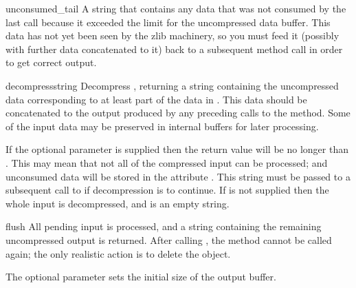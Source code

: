 \begin{memberdesc}{unconsumed_tail}
A string that contains any data that was not consumed by the last
 call because it exceeded the limit for the
uncompressed data buffer.  This data has not yet been seen by the zlib
machinery, so you must feed it (possibly with further data
concatenated to it) back to a subsequent  method
call in order to get correct output.
\end{memberdesc}


\begin{methoddesc}[Decompress]{decompress}{string}
Decompress , returning a string containing the
uncompressed data corresponding to at least part of the data in
.  This data should be concatenated to the output produced
by any preceding calls to the
 method.  Some of the input data may be preserved
in internal buffers for later processing.

If the optional parameter  is supplied then the return value
will be no longer than . This may mean that not all of the
compressed input can be processed; and unconsumed data will be stored
in the attribute . This string must be passed
to a subsequent call to  if decompression is to
continue.  If  is not supplied then the whole input is
decompressed, and  is an empty string.
\end{methoddesc}

\begin{methoddesc}[Decompress]{flush}{}
All pending input is processed, and a string containing the remaining
uncompressed output is returned.  After calling , the
 method cannot be called again; the only realistic
action is to delete the object.

The optional parameter  sets the initial size of the
output buffer.
\end{methoddesc}

\begin{seealso}
\end{seealso}
